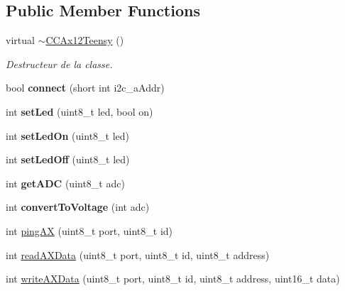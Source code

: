 \subsection*{Public Member Functions}
\begin{DoxyCompactItemize}
\item 
\mbox{\label{classCCAx12Teensy_a0efc6bc1842f2548ce94fa8f72dab7ac}} 
virtual \hyperlink{classCCAx12Teensy_a0efc6bc1842f2548ce94fa8f72dab7ac}{$\sim$\+C\+C\+Ax12\+Teensy} ()
\begin{DoxyCompactList}\small\item\em Destructeur de la classe. \end{DoxyCompactList}\item 
\mbox{\label{classCCAx12Teensy_a67a40bbeae8b21ed7b62ef504bb24788}} 
bool {\bfseries connect} (short int i2c\+\_\+a\+Addr)
\item 
\mbox{\label{classCCAx12Teensy_a743dbb935093a782f9985db895a1fc27}} 
int {\bfseries set\+Led} (uint8\+\_\+t led, bool on)
\item 
\mbox{\label{classCCAx12Teensy_aa3a9e62109ec26dbbeab2b3c69845163}} 
int {\bfseries set\+Led\+On} (uint8\+\_\+t led)
\item 
\mbox{\label{classCCAx12Teensy_aabde87b12a39781e684b537f674473df}} 
int {\bfseries set\+Led\+Off} (uint8\+\_\+t led)
\item 
\mbox{\label{classCCAx12Teensy_a156bd7d48da829aec67237d60c7be7a5}} 
int {\bfseries get\+A\+DC} (uint8\+\_\+t adc)
\item 
\mbox{\label{classCCAx12Teensy_ae46cd040e0c9d44a794c7f515b51e711}} 
int {\bfseries convert\+To\+Voltage} (int adc)
\item 
int \hyperlink{classCCAx12Teensy_a7a4be50ad46846c5a1d8a8bb80af6ce5}{ping\+AX} (uint8\+\_\+t port, uint8\+\_\+t id)
\item 
int \hyperlink{classCCAx12Teensy_a3b838fec3ab75c627fc03725f483599c}{read\+A\+X\+Data} (uint8\+\_\+t port, uint8\+\_\+t id, uint8\+\_\+t address)
\item 
int \hyperlink{classCCAx12Teensy_aad5eb7a2a208b355c8d84b853c362345}{write\+A\+X\+Data} (uint8\+\_\+t port, uint8\+\_\+t id, uint8\+\_\+t address, uint16\+\_\+t data)

\end{DoxyCompactItemize}
